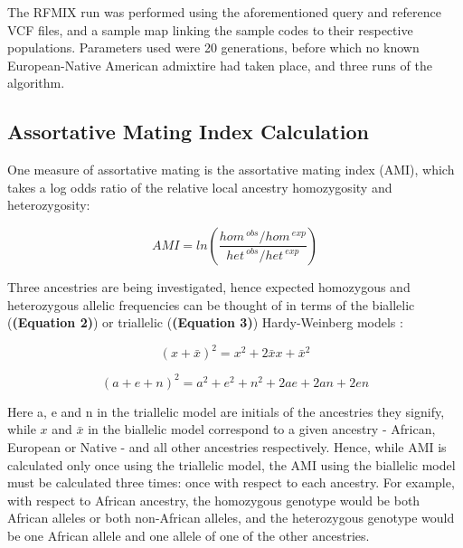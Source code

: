 \documentclass[11pt]{article}
\begin{document}
The RFMIX run was performed using the aforementioned query and reference VCF files, and a sample map linking the sample codes to their respective populations. Parameters used were 20 generations, before which no known European-Native American admixtire had taken place, and three runs of the algorithm.





\subsection{Assortative Mating Index Calculation}


One measure of assortative mating is the assortative mating index (AMI), which takes a log odds ratio of the relative local ancestry homozygosity and heterozygosity:


\begin{equation}
    AMI = ln{\left( \frac{ hom^{\: obs} / hom^{\: exp} }
                         { het^{\: obs} / het^{\: exp} } \right)}
\end{equation}
\vspace{3mm}


Three ancestries are being investigated, hence expected homozygous and heterozygous allelic frequencies can be thought of in terms of the biallelic (\textbf{(Equation 2)}) or triallelic (\textbf{(Equation 3)}) Hardy-Weinberg models \parencite{Norris2019}: 

\begin{equation}
    (x + \bar{x})^{2} = x^{2} + 2\bar{x}x + \bar{x}^{2}
\end{equation}


\begin{equation}
    (a + e + n)^{2} = a^{2} + e^{2} + n^{2} + 2ae + 2an + 2en
\end{equation}
\vspace{3mm}


Here a, e and n in the triallelic model are initials of the ancestries they signify, while $x$ and $\bar{x}$ in the biallelic model correspond to a given ancestry - African, European or Native - and all other ancestries respectively. Hence, while AMI is calculated only once using the triallelic model, the AMI using the biallelic model must be calculated three times: once with respect to each ancestry. For example, with respect to African ancestry, the homozygous genotype would be both African alleles or both non-African alleles, and the heterozygous genotype would be one African allele and one allele of one of the other ancestries.
\end{document}
